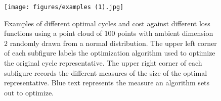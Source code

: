 \documentclass[utf8]{formatting_stuff/frontiersFPHY}
\theoremstyle{plain}
\theoremstyle{definition}
\begin{document}
 \begin{landscape}
\begin{figure}[hbt!]
\begin{center}
\texttt{[image: figures/examples (1).jpg]}
\end{center}
\caption{Examples of different optimal cycles and cost against different loss functions using a point cloud of $100$ points with ambient dimension $2$ randomly drawn from a normal distribution. The upper left corner of each subfigure labels the optimization algorithm used to optimize the original cycle representative. The upper right corner of each subfigure records the different measures of the size of the optimal representative. Blue text represents the measure an algorithm sets out to optimize. 
}\label{fig:Examplesofeachoptimalcycles} 
\end{figure}
\end{landscape}
\end{document}
